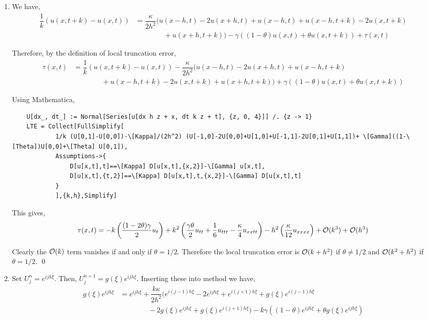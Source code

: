 \documentclass[10pt]{article}
\begin{document}
\begin{solution}[Solution]

\begin{enumerate}[label=(\alph*)]
    \item We have,
    \begin{align*}
        \dfrac{1}{k}(u(x,t+k) - u(x,t)) &= \dfrac{\kappa}{2h^2} ( u(x-h,t) - 2u(x+h,t) + u(x-h,t) + u(x-h,t+k) - 2u(x,t+k)
        \\& \hspace{4em} + u(x+h,t+k) ) - \gamma((1-\theta)u(x,t) + \theta u(x,t+k) ) + \tau(x,t)
    \end{align*}

    Therefore, by the definition of local truncation error,
    \begin{align*}
        \tau(x,t) &= \dfrac{1}{k}(u(x,t+k) - u(x,t)) -  \dfrac{\kappa}{2h^2} ( u(x-h,t) - 2u(x+h,t) + u(x-h,t+k)
        \\& \hspace{4em} + u(x-h,t+k)  - 2u(x,t+k) + u(x+h,t+k) ) + \gamma((1-\theta)u(x,t) + \theta u(x,t+k) )
    \end{align*}

    Using Mathematica,
    \begin{lstlisting}
    U[dx_, dt_] := Normal[Series[u[dx h z + x, dt k z + t], {z, 0, 4}]] /. {z -> 1}
    LTE = Collect[FullSimplify[
            1/k (U[0,1]-U[0,0])-\[Kappa]/(2h^2) (U[-1,0]-2U[0,0]+U[1,0]+U[-1,1]-2U[0,1]+U[1,1])+ \[Gamma]((1-\[Theta])U[0,0]+\[Theta] U[0,1]),
            Assumptions->{
                D[u[x,t],t]==\[Kappa] D[u[x,t],{x,2}]-\[Gamma] u[x,t],
                D[u[x,t],{t,2}]==\[Kappa] D[u[x,t],t,{x,2}]-\[Gamma] D[u[x,t],t]
            }
            ],{k,h},Simplify]
    \end{lstlisting}
    This gives,
    \begin{align*}
        \tau(x,t) = - k \left( \dfrac{(1-2\theta)\gamma}{2} u_t \right) + k^2 \left( \dfrac{\gamma\theta }{2}u_{tt}+\dfrac{1}{6}u_{ttt}-\dfrac{\kappa}{4} u_{xxtt} \right)- h^2 \left(\dfrac{\kappa }{12}u_{xxxx} \right) + \mathcal{O}(k^3) + \mathcal{O}(h^3)
    \end{align*}

    Clearly the \( \mathcal{O}(k) \) term vanishes if and only if \( \theta = 1/2 \). Therefore the local truncation error is \( \mathcal{O}(k+h^2) \) if \( \theta \neq 1/2 \) and \( \mathcal{O}(k^2+h^2) \) if \( \theta = 1/2 \). \qed

    \item Set \( U_j^n = e^{ijh\xi} \). Then, \( U_j^{n+1} = g(\xi)e^{ijh\xi} \). Inserting these into method we have,
    \begin{align*}
        g(\xi)e^{ijh\xi} &= e^{ijh\xi} + \dfrac{k\kappa}{2h^2}\Big(e^{i(j-1)h\xi} - 2e^{ijh\xi} + e^{i(j+1)h\xi} + g(\xi)e^{i(j-1)h\xi}
        \\& \hspace{4em}- 2g(\xi)e^{ijh\xi} + g(\xi)e^{i(j+1)h\xi} \Big) - k\gamma\left((1-\theta)e^{ijh\xi} + \theta g(\xi)e^{ijh\xi} \right)
    \end{align*}


\end{enumerate}
\end{solution}
\end{document}
